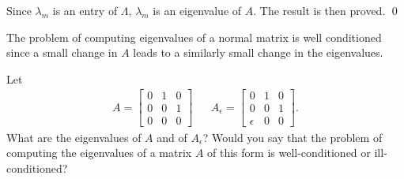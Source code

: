\documentclass[10pt]{article}
\begin{document}
\begin{solution}[Solution]
Since \( \lambda_m \) is an entry of \( \Lambda \), \( \lambda_m \) is an eigenvalue of \( A \). The result is then proved. \qed

The problem of computing eigenvalues of a normal matrix is well conditioned since a small change in \( A \) leads to a similarly small change in the eigenvalues. 

\end{solution}

\begin{problem}[Exercise 2]
Let
\begin{align*}
    A = \left[ \begin{array}{ccc} 0 & 1 & 0 \\ 0 & 0 & 1 \\ 0 & 0 & 0 \end{array} \right] &&
A_{\epsilon} = \left[ \begin{array}{ccc} 0 & 1 & 0 \\ 0 & 0 & 1 \\ \epsilon & 0 & 0 \end{array} \right] .
\end{align*}
What are the eigenvalues of \(A\) and of \(A_{\epsilon}\)?  Would you say that the problem of computing the eigenvalues of a matrix \(A\) of this form is well-conditioned or ill-conditioned?  
\end{problem}
\end{document}
